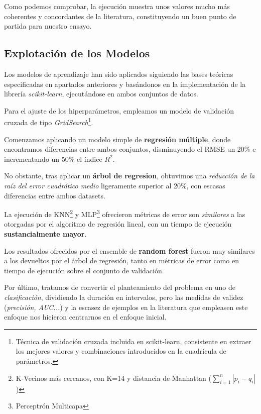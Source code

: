 Como podemos comprobar, la ejecución muestra unos valores mucho más coherentes y concordantes de la literatura, constituyendo un buen punto de partida para nuestro ensayo.

\subsection{Explotación de los Modelos}

Los modelos de aprendizaje han sido aplicados siguiendo las bases teóricas especificadas en apartados anteriores y basándonos en la implementación de la librería \textit{scikit-learn}\cite{2021Scikit-LearnPython}, ejecutándose en ambos conjuntos de datos.

Para el ajuste de los hiperparámetros, empleamos un modelo de validación cruzada de tipo \textit{GridSearch}\footnote{Técnica de validación cruzada incluida en scikit-learn, consistente en extraer los mejores valores y combinaciones introducidos en la cuadrícula de parámetros.}.

Comenzamos aplicando un modelo simple de \textbf{regresión múltiple}, donde encontramos diferencias entre ambos conjuntos,  disminuyendo el RMSE un 20\% e incrementando un 50\% el índice $R^{2}$.

No obstante, tras aplicar un \textbf{árbol de regresion},  obtuvimos una \textit{reducción de la raíz del error cuadrático medio} ligeramente superior al 20\%, con escasas diferencias entre ambos datasets.


La ejecución de KNN\footnote{K-Vecinos más cercanos, con K=14 y distancia de Manhattan (\(\sum_{i=1}^{n} |p_{i} - q_{i}|\))} y MLP\footnote{Perceptrón Multicapa} ofrecieron métricas de error son \textit{similares} a las otorgadas por el algoritmo de regresión lineal, con un tiempo de ejecución \textbf{sustancialmente mayor}.

Los resultados ofrecidos por el ensemble de \textbf{random forest} fueron muy similares a los devueltos por el árbol de regresión, tanto en métricas de error como en tiempo de ejecución sobre el conjunto de validación.

Por último, tratamos de convertir el planteamiento del problema en uno de \textit{clasificación}, dividiendo la duración en intervalos, pero las medidas de validez (\textit{precisión, AUC...}) y la escasez de ejemplos en la literatura que empleasen este enfoque nos hicieron centrarnos en el enfoque inicial.


